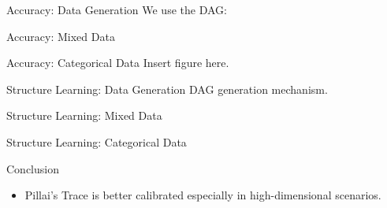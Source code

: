 \documentclass{beamer}
\begin{document}
\begin{frame}{Accuracy: Data Generation}
	We use the DAG:

\begin{center}
\end{center}
\end{frame}

\begin{frame}{Accuracy: Mixed Data}
\end{frame}

\begin{frame}{Accuracy: Categorical Data}
	Insert figure here.
\end{frame}


\begin{frame}{Structure Learning: Data Generation}
	DAG generation mechanism.
\end{frame}

\begin{frame}{Structure Learning: Mixed Data}
\end{frame}

\begin{frame}{Structure Learning: Categorical Data}
\end{frame}

\begin{frame}{Conclusion}
	\begin{itemize}
		\item Pillai's Trace is better calibrated especially in high-dimensional scenarios.
	\end{itemize}
\end{frame}
\end{document}

